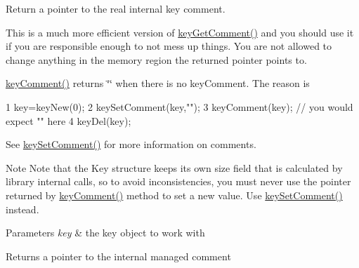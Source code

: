 Return a pointer to the real internal {\ttfamily key} comment. 

This is a much more efficient version of \hyperlink{group__meta_gafb89735689929ff717cc9f2d0d0b46a2}{key\+Get\+Comment()} and you should use it if you are responsible enough to not mess up things. You are not allowed to change anything in the memory region the returned pointer points to.

\hyperlink{group__meta_gac89fd319783b3457db45b4c09e55274a}{key\+Comment()} returns \char`\"{}\char`\"{} when there is no key\+Comment. The reason is 
\begin{DoxyCode}
1 key=keyNew(0);
2 keySetComment(key,"");
3 keyComment(key); // you would expect "" here
4 keyDel(key);
\end{DoxyCode}


See \hyperlink{group__meta_ga8863a877a84fa46e6017fe72e49b89c1}{key\+Set\+Comment()} for more information on comments.

\begin{DoxyNote}{Note}
Note that the Key structure keeps its own size field that is calculated by library internal calls, so to avoid inconsistencies, you must never use the pointer returned by \hyperlink{group__meta_gac89fd319783b3457db45b4c09e55274a}{key\+Comment()} method to set a new value. Use \hyperlink{group__meta_ga8863a877a84fa46e6017fe72e49b89c1}{key\+Set\+Comment()} instead.
\end{DoxyNote}

\begin{DoxyParams}{Parameters}
{\em key} & the key object to work with \\
\hline
\end{DoxyParams}
\begin{DoxyReturn}{Returns}
a pointer to the internal managed comment 
\end{DoxyReturn}

